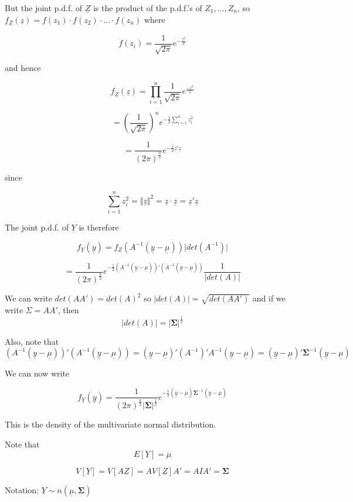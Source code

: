 \documentclass[12pt,a4paper]{article}
\theoremstyle{regla}
\theoremstyle{remark}
\theoremstyle{definition}
\theoremstyle{nonumberbreak}
\begin{document}
But the joint p.d.f. of $\underline{Z}$ is the product of the p.d.f.'s of $Z_1, \ldots , Z_n$, so $f_{\underline{Z}}(\underline{z})= f(z_1) \cdot f(z_2) \cdot \ldots \cdot f(z_n)$ where

$$f(z_i) = \frac{1}{\sqrt{2 \pi}} e^{-\frac{z^2}{2}}$$

and hence

$$f_{\underline{Z}}(\underline{z}) = \prod_{i=1}^n \frac{1}{\sqrt{2 \pi}} e^{\frac{-z^2}{2}}$$

$$ = (\frac{1}{\sqrt{2 \pi}})^n e^{-\frac{1}{2} \sum_{i=1}^n z_i^2}$$

$$=\frac{1}{(2 \pi)^\frac{n}{2}} e^{-\frac{1}{2} \underline{z}'\underline{z}}$$

since

$$\sum_{i=1}^n z_i^2 = \Vert \underline{z} \Vert ^2 = \underline{z} \cdot \underline{z} = \underline{z}'  \underline{z}$$

The joint p.d.f. of $\underline{Y}$ is therefore 

$$f_{\underline{Y}}(\underline{y}) = f_{\underline{Z}}(A^{-1}(\underline{y} - \underline{\mu})) \vert det(A^{-1}) \vert $$

$$=\frac{1}{(2 \pi)^{\frac{n}{2}}} e^{-\frac{1}{2}(A^{-1}(\underline{y}-\underline{\mu}))'(A^{-1}(\underline{y}-\underline{\mu}))}\frac{1}{\vert det(A)\vert}$$

We can write $det(AA')=det(A)^2$ so $\vert det(A)\vert = \sqrt{det(AA')}$ and if we write $\Sigma=AA'$, then 
$$\vert det(A) \vert = \vert \boldsymbol{\Sigma} \vert ^\frac{1}{2}$$


Also, note that 
$$(A^{-1}(\underline{y}-\underline{\mu}))'(A^{-1}(\underline{y}-\underline{\mu})) = (\underline{y} - \underline{\mu})'(A^{-1})' A^{-1}(\underline{y} - \underline{\mu}) = (\underline{y} - \underline{\mu})' \boldsymbol{\Sigma}^{-1}(\underline{y}-\underline{\mu})$$

We can now write

$$f_{\underline{Y}}(\underline{y}) = \frac{1}{(2 \pi)^\frac{n}{2} \vert \boldsymbol{\Sigma} \vert ^{\frac{1}{2}}} e^{-\frac{1}{2} (\underline{y}-\underline{\mu}) \boldsymbol{\Sigma}^{-1} (\underline{y}-\underline{\mu})}$$

This is the density of the multivariate normal distribution.

Note that 
$$E[\underline{Y}] = \mu$$

$$V[\underline{Y}] = V[A\underline{Z}] = AV[\underline{Z}]A' = AIA' = \boldsymbol{\Sigma}$$

Notation: $\underline{Y}\sim n(\underline{\mu}, \boldsymbol{\Sigma})$
\end{document}

